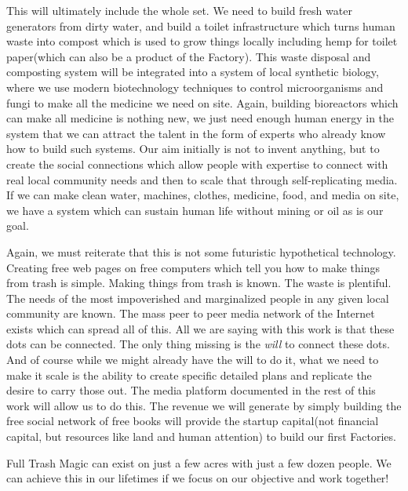 This will ultimately include the whole set. We need to build fresh water
generators from dirty water, and build a toilet infrastructure which
turns human waste into compost which is used to grow things locally
including hemp for toilet paper(which can also be a product of the
Factory). This waste disposal and composting system will be integrated
into a system of local synthetic biology, where we use modern
biotechnology techniques to control microorganisms and fungi to make all
the medicine we need on site. Again, building bioreactors which can make
all medicine is nothing new, we just need enough human energy in the
system that we can attract the talent in the form of experts who already
know how to build such systems. Our aim initially is not to invent
anything, but to create the social connections which allow people with
expertise to connect with real local community needs and then to scale
that through self-replicating media. If we can make clean water,
machines, clothes, medicine, food, and media on site, we have a system
which can sustain human life without mining or oil as is our goal.

Again, we must reiterate that this is not some futuristic hypothetical
technology. Creating free web pages on free computers which tell you how
to make things from trash is simple. Making things from trash is known.
The waste is plentiful. The needs of the most impoverished and
marginalized people in any given local community are known. The mass
peer to peer media network of the Internet exists which can spread all
of this. All we are saying with this work is that these dots can be
connected. The only thing missing is the \emph{will} to connect these
dots. And of course while we might already have the will to do it, what
we need to make it scale is the ability to create specific detailed
plans and replicate the desire to carry those out. The media platform
documented in the rest of this work will allow us to do this. The
revenue we will generate by simply building the free social network of
free books will provide the startup capital(not financial capital, but
resources like land and human attention) to build our first Factories.

Full Trash Magic can exist on just a few acres with just a few dozen
people. We can achieve this in our lifetimes if we focus on our
objective and work together!
